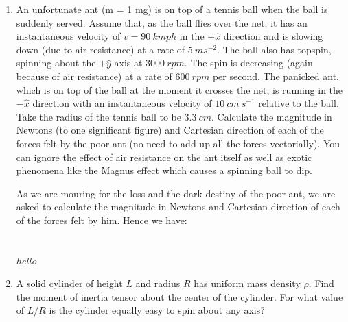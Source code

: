 \documentclass[fleqn]{article}
\begin{document}
\begin{enumerate}
    \item An unfortunate ant (m = 1 mg) is on top of a tennis ball when the ball is suddenly served. Assume that, as the ball flies over the net,
    it has an instantaneous velocity of $v=90 ~ kmph$ in the $+\hat{x}$ direction and is slowing down (due to air resistance) at a rate of
    $5 ~ ms^{-2}$. The ball also has topspin, spinning about the $+\hat{y}$ axis at $3000 ~ rpm$. The spin is decreasing (again because of air resistance) at a rate of
    $600 ~ rpm$ per second. The panicked ant, which is on top of the ball at the moment it crosses the net, is running in the $-\hat{x}$ direction with an
    instantaneous velocity of $10 ~ cm ~ s^{-1}$ relative to the ball. Take the radius of the tennis ball to be $3.3 ~ cm$. Calculate the magnitude in Newtons
    (to one significant figure) and Cartesian direction of each of the forces felt by the poor ant (no need to add up all the forces vectorially). You
    can ignore the effect of air resistance on the ant itself as well as exotic phenomena like the Magnus effect which causes a spinning ball to dip.

      \textcolor{hwColor}{
        As we are mouring for the loss and the dark destiny of the poor ant, we are asked to calculate the magnitude in Newtons 
        and Cartesian direction of each of the forces felt by him. Hence we have: \\
        \\
        \\
        $
          hello
        $
      }

    \item A solid cylinder of height $L$ and radius $R$ has uniform mass density $\rho$. Find the moment of inertia tensor about the center of the cylinder. For
    what value of $L/R$ is the cylinder equally easy to spin about any axis?


\end{enumerate}
\end{document}
